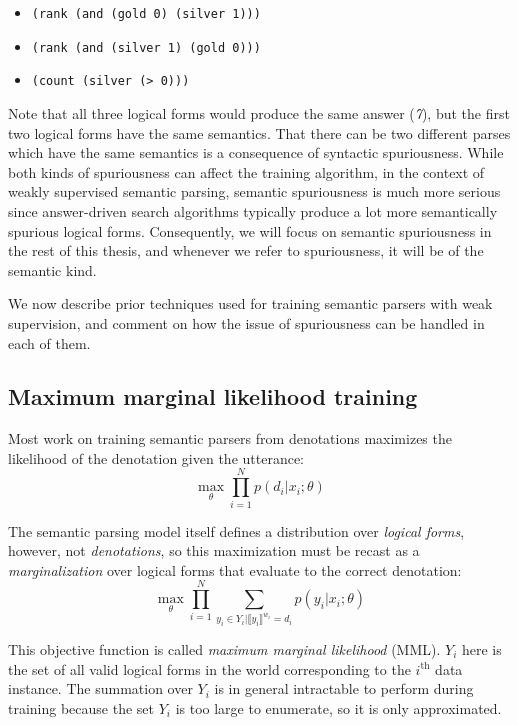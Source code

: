 \begin{itemize}
	\item \texttt{(rank (and (gold 0) (silver 1)))}
	\item \texttt{(rank (and (silver 1) (gold 0)))}
	\item \texttt{(count (silver (> 0)))}
\end{itemize}

Note that all three logical forms would produce the same answer (\textit{7}), but the first two logical
forms have the same semantics. That there can be two different parses which have the same semantics is a consequence of
syntactic spuriousness. While both kinds of spuriousness can affect the training algorithm, in the context of
weakly supervised semantic parsing, semantic spuriousness is much more serious since answer-driven
search algorithms typically produce a lot more semantically spurious logical forms. Consequently, we will focus on
semantic spuriousness in the rest of this thesis, and whenever we refer to spuriousness, it will be of the semantic kind.

We now describe prior
techniques used for training semantic parsers with
weak supervision, and comment on how the issue of spuriousness can be handled in
each of them.

\subsection{Maximum marginal likelihood training}\label{sec:mml}
Most work on training semantic parsers from denotations maximizes the
likelihood of the denotation given the utterance:
\begin{equation}
	\max_\theta \prod_{i=1}^N p(d_i|x_i; \theta)
\end{equation}

\noindent The semantic parsing model itself defines a distribution over
\emph{logical forms}, however, not \emph{denotations}, so this maximization
must be recast as a \emph{marginalization} over logical forms that evaluate to
the correct denotation:
\begin{equation}
	\max_\theta \prod_{i=1}^N
	\sum_{y_i \in Y_i | \llbracket y_i \rrbracket^{w_i} = d_i} p(y_i | x_i; \theta)
	\label{eq:mml_objective}
\end{equation}

\noindent This objective function is called \emph{maximum marginal likelihood}
(MML).  $Y_i$ here is the set of all valid logical forms in the world
corresponding to the $i^\text{th}$ data instance. The summation over $Y_i$ is in
general intractable to perform during training because the set $Y_i$ is too
large to enumerate, so it is only approximated.

